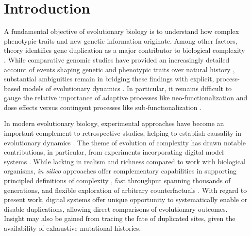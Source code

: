 \section{Introduction} \label{sec:introduction}

A fundamental objective of evolutionary biology is to understand how complex phenotypic traits and new genetic information originate.
Among other factors, theory identifies gene duplication as a major contributor to biological complexity \citep{Zhang2003,Otto2000,Wagner2008,Wagner2007,Crow:2006role,Magadum:2013wu,Metz:chromosomeDuplication1947,Hu:2010ea}.
While comparative genomic studies have provided an increasingly detailed account of events shaping genetic and phenotypic traits over natural history \citep{Zhang2014,teichmann_structural_1998,Teichmann:2004cz}, substantial ambiguities remain in bridging these findings with explicit, process-based models of evolutionary dynamics \citep{Welch2016}.
In particular, it remains difficult to gauge the relative importance of adaptive processes like neo‑functionalization and dose effects versus contingent processes like sub‑functionalization \citep{Innan2010,Zhang:2003fw}.

In modern evolutionary biology, experimental approaches have become an important complement to retrospective studies, helping to establish causality in evolutionary dynamics \citep{Kawecki2012}.
The theme of evolution of complexity has drawn notable contributions, in particular, from experiments incorporating digital model systems \citep{Fortuna2022}.
While lacking in realism and richness compared to work with biological organisms, \textit{in silico} approaches offer complementary capabilities in supporting principled definitions of complexity \citep{Adami2002}, fast throughput spanning thousands of generations, and flexible exploration of arbitrary counterfactuals \citep{langton1989artificial}.
With regard to present work, digital systems offer unique opportunity to systematically enable or disable duplications, allowing direct comparisons of evolutionary outcomes.
Insight may also be gained from tracing the fate of duplicated sites, given the availability of exhaustive mutational histories.

